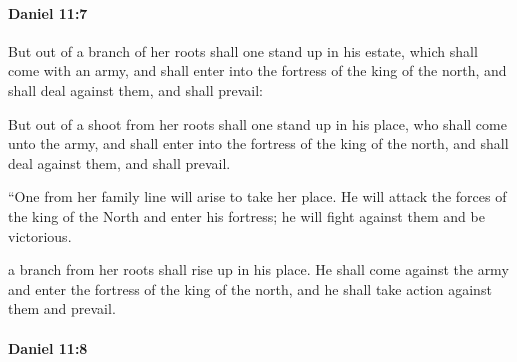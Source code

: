 		\paragraph{Daniel 11:7} %
			\label{DANIEL-11-7}

			But out of a branch of her roots shall one stand up in his estate, which shall come with an army, and shall enter into the fortress of the king of the north, and shall deal against them, and shall prevail:

			\begin{versebox}
					\item[BHS] 
					\item[LXX] 
					\item[ASV] But out of a shoot from her roots shall one stand up in his place, who shall come unto the army, and shall enter into the fortress of the king of the north, and shall deal against them, and shall prevail.
					\item[NIV] “One from her family line will arise to take her place. He will attack the forces of the king of the North and enter his fortress; he will fight against them and be victorious.
					\item[NRSV] a branch from her roots shall rise up in his place. He shall come against the army and enter the fortress of the king of the north, and he shall take action against them and prevail.
			\end{versebox}

		\paragraph{Daniel 11:8} %
			\label{DANIEL-11-8}

